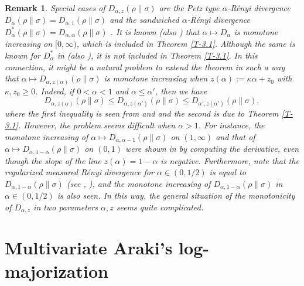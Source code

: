 \documentclass[11pt,reqno]{article}
\newtheorem{remark}[theorem]{Remark}
\numberwithin{equation}{section}
\begin{document}
\begin{remark}\label{R-3.2}\rm
Special cases of $D_{\alpha,z}(\rho\|\sigma)$ are the \emph{Petz type $\alpha$-R\'enyi divergence}
$D_\alpha(\rho\|\sigma)=D_{\alpha,1}(\rho\|\sigma)$ \cite{Pe} and the
\emph{sandwiched $\alpha$-R\'enyi divergence} $D_\alpha^*(\rho\|\sigma)=D_{\alpha,\alpha}(\rho\|\sigma)$
\cite{MDSFT,WWY}. It is known \cite[Lemma II.2]{MH1} (also \cite[Proposition 5.3(4)]{Hi3}) that
$\alpha\mapsto D_\alpha$ is monotone increasing on $[0,\infty)$, which is included in Theorem \ref{T-3.1}.
Although the same is known for $D_\alpha^*$ in \cite[Theorem 7]{MDSFT} (also \cite[Lemma 8]{BST}), it is
not included in Theorem \ref{T-3.1}. In this connection, it might be a natural problem to extend the theorem in
such a way that $\alpha\mapsto D_{\alpha,z(\alpha)}(\rho\|\sigma)$ is monotone increasing when
$z(\alpha):=\kappa\alpha+z_0$ with $\kappa,z_0\ge0$. Indeed, if $0<\alpha<1$ and $\alpha\le\alpha'$, then
we have
\[
D_{\alpha,z(\alpha)}(\rho\|\sigma)\le D_{\alpha,z(\alpha')}(\rho\|\sigma)
\le D_{\alpha',z(\alpha')}(\rho\|\sigma),
\]
where the first inequality is seen from \cite[Proposition 1]{LT} and \cite[(II.21)]{MH2} and the second is due to
Theorem \ref{T-3.1}. However, the problem seems difficult when $\alpha>1$. For instance, the monotone
increasing of $\alpha\mapsto D_{\alpha,\alpha-1}(\rho\|\sigma)$ on $(1,\infty)$ and that of
$\alpha\mapsto D_{\alpha,1-\alpha}(\rho\|\sigma)$ on $(0,1)$ were shown in \cite[Lemma 25]{RTT} by
computing the derivative, even though the slope of the line $z(\alpha)=1-\alpha$ is negative. Furthermore, note
that the regularized measured R\'enyi divergence for $\alpha\in(0,1/2)$ is equal to
$D_{\alpha,1-\alpha}(\rho\|\sigma)$ (see \cite[Example III.35]{MBV}, \cite[(II.17)]{MH2}), and the monotone
increasing of $D_{\alpha,1-\alpha}(\rho\|\sigma)$ in $\alpha\in(0,1/2)$ is also seen. In this way, the general
situation of the monotonicity of $D_{\alpha,z}$ in two parameters $\alpha,z$ seems quite complicated.
\end{remark}

\section{Multivariate Araki's log-majorization}\label{Sec-4}
\end{document}
